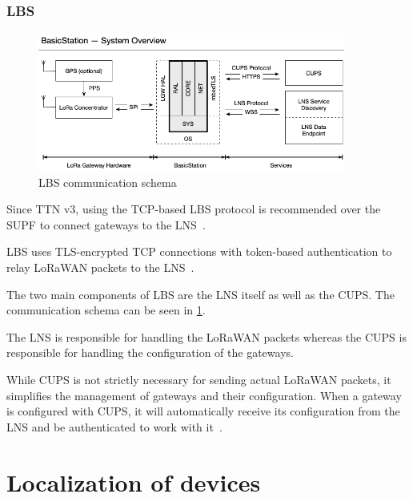 \subsubsection{\acf{LBS}}

\begin{figure}[h]
    \centering
    \includegraphics[width=0.9\textwidth]{pictures/lorawan-structure/lora-basics-station-structure.png}
    \caption{\acf{LBS} communication schema~\protect\cite{semtech_lora_developer_portal_lora_2022}}\label{pic:lora-basics-station-schema}
\end{figure}

Since \ac{TTN} v3, using the \ac{TCP}-based \acl{LBS} protocol is recommended over the \ac{SUPF} to connect gateways to the \ac{LNS}~\cite{the_things_industries_bv_semtech_2022}.

\ac{LBS} uses \ac{TLS}-encrypted \ac{TCP} connections with token-based authentication to relay \ac{LoRaWAN} packets to the \ac{LNS}~\cite{the_things_industries_bv_lora_2022}.

The two main components of \acl{LBS} are the \ac{LNS} itself as well as the \acf{CUPS}.
The communication schema can be seen in \cref{pic:lora-basics-station-schema}.

The \ac{LNS} is responsible for handling the \ac{LoRaWAN} packets whereas the \acl{CUPS} is responsible for handling the configuration of the gateways.

While \ac{CUPS} is not strictly necessary for sending actual \ac{LoRaWAN} packets, it simplifies the management of gateways and their configuration.
When a gateway is configured with \ac{CUPS}, it will automatically receive its configuration from the \ac{LNS} and be authenticated to work with it~\cite{the_things_industries_bv_lora_2022}.

\section{Localization of devices}

